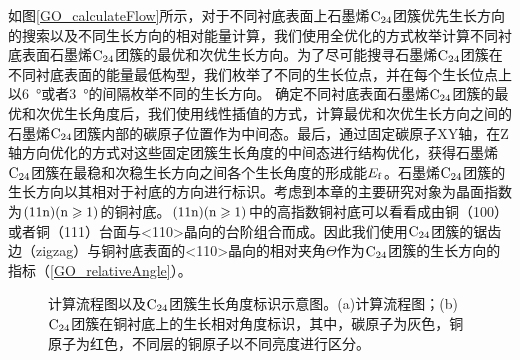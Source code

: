     如图\ref{GO_calculateFlow}所示，对于不同衬底表面上石墨烯$\rm{C_{24}}$团簇优先生长方向的搜索以及不同生长方向的相对能量计算，我们使用全优化的方式枚举计算不同衬底表面石墨烯$\rm{C_{24}}$团簇的最优和次优生长方向。为了尽可能搜寻石墨烯$\rm{C_{24}}$团簇在不同衬底表面的能量最低构型，我们枚举了不同的生长位点，并在每个生长位点上以\SI{6}{\degree}或者\SI{3}{\degree}的间隔枚举不同的生长方向。 确定不同衬底表面石墨烯$\rm{C_{24}}$团簇的最优和次优生长角度后，我们使用线性插值的方式，计算最优和次优生长方向之间的石墨烯$\rm{C_{24}}$团簇内部的碳原子位置作为中间态。最后，通过固定碳原子XY轴，在Z轴方向优化的方式对这些固定团簇生长角度的中间态进行结构优化，获得石墨烯$\rm{C_{24}}$团簇在最稳和次稳生长方向之间各个生长角度的形成能$E_{\rm{f}}$。石墨烯$\rm{C_{24}}$团簇的生长方向以其相对于衬底的方向进行标识。考虑到本章的主要研究对象为晶面指数为$\rm{(11n)(n \geqslant 1)}$的铜衬底。$\rm{(11n)(n \geqslant 1)}$中的高指数铜衬底可以看看成由铜（100）或者铜（111）台面与<110>晶向的台阶组合而成。因此我们使用$\rm{C_{24}}$团簇的锯齿边（zigzag）与铜衬底表面的<110>晶向的相对夹角$\Theta$作为$\rm{C_{24}}$团簇的生长方向的指标（\ref{GO_relativeAngle}）。
    \begin{figure}
        \caption{计算流程图以及$\rm{C_{24}}$团簇生长角度标识示意图。(a)计算流程图；(b)$\rm{C_{24}}$团簇在铜衬底上的生长相对角度标识，其中，碳原子为灰色，铜原子为红色，不同层的铜原子以不同亮度进行区分。}
        \label{GO_calculateFlow_relativeAngle}
    \end{figure}

